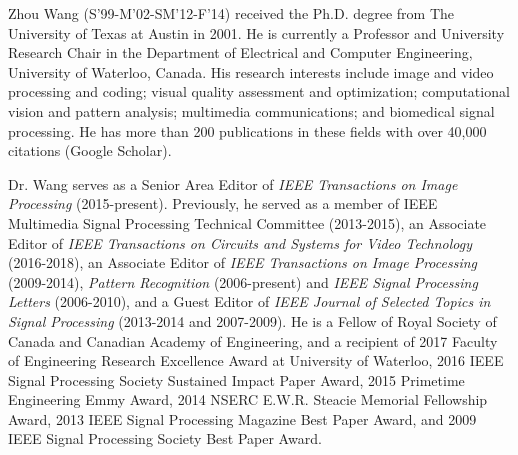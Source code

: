 \documentclass[journal]{IEEEtran}
\begin{document}
\begin{IEEEbiography}{Zhou Wang}
(S'99-M'02-SM'12-F'14) received the Ph.D. degree from The University of Texas at Austin in 2001. He is currently a Professor and University Research Chair in the Department of Electrical and Computer Engineering, University of Waterloo, Canada. His research interests include image and video processing and coding; visual quality assessment and optimization; computational vision and pattern analysis; multimedia communications; and biomedical signal processing. He has more than 200 publications in these fields with over 40,000 citations (Google Scholar).

Dr. Wang serves as a Senior Area Editor of {\em IEEE Transactions on Image Processing} (2015-present). Previously, he served as a member of IEEE Multimedia Signal Processing Technical Committee (2013-2015), an Associate Editor of {\em IEEE Transactions on Circuits and Systems for Video Technology} (2016-2018), an Associate Editor of {\em IEEE Transactions on Image Processing} (2009-2014), {\em Pattern Recognition} (2006-present) and {\em IEEE Signal Processing Letters} (2006-2010), and a Guest Editor of {\em IEEE Journal of Selected Topics in Signal Processing} (2013-2014 and 2007-2009). He is a Fellow of Royal Society of Canada and Canadian Academy of Engineering, and a recipient of 2017 Faculty of Engineering Research Excellence Award at University of Waterloo, 2016 IEEE Signal Processing Society Sustained Impact Paper Award, 2015 Primetime Engineering Emmy Award, 2014 NSERC E.W.R. Steacie Memorial Fellowship Award, 2013 IEEE Signal Processing Magazine Best Paper Award, and 2009 IEEE Signal Processing Society Best Paper Award.
\end{IEEEbiography}
\end{document}
